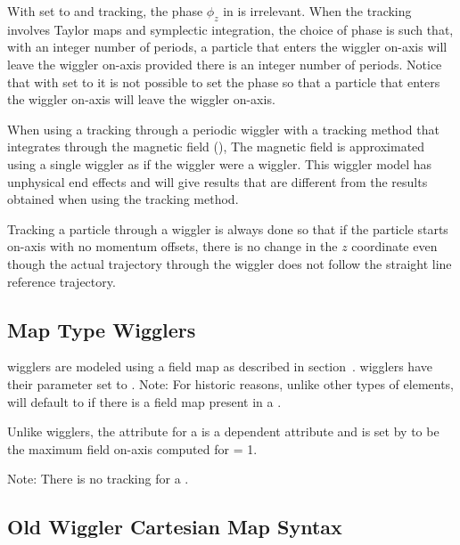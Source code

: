 {With  set to  and  tracking, the phase $\phi_z$ in
 is irrelevant. When the tracking involves Taylor maps and symplectic integration, the
choice of phase is such that, with an integer number of periods, a particle that enters the wiggler
on-axis will leave the wiggler on-axis provided there is an integer number of periods. Notice that with
 set to  it is not possible to set the phase so that a particle
that enters the wiggler on-axis will leave the wiggler on-axis. 

When using a tracking through a periodic wiggler with a tracking method that integrates through the
magnetic field (), The magnetic field is approximated using a single wiggler 
as if the wiggler were a  wiggler. This wiggler model has unphysical end effects and
will give results that are different from the results obtained when using the 
tracking method.

Tracking a particle through a wiggler is always done so that if the particle starts on-axis with no
momentum offsets, there is no change in the $z$ coordinate even though the actual trajectory through
the wiggler does not follow the straight line reference trajectory.

\subsection{Map Type Wigglers}
\label{s:wiggler.map}

 wigglers are modeled using a field map as described in section~.
 wigglers have their  parameter set to . Note: For historic
reasons, unlike other types of elements,  will default to  if there is a
field map present in a .

Unlike  wigglers, the  attribute for a   
is a dependent attribute and is 
set by \bmad to be the maximum field on-axis computed for  = 1.

Note: There is no  tracking for a  . 

\subsection{Old Wiggler Cartesian Map Syntax}
\label{s:old.wiggler}

}
